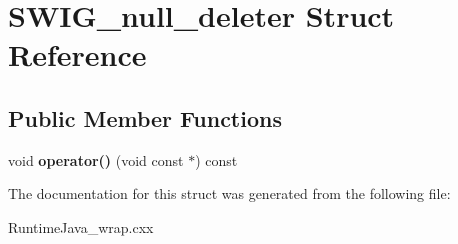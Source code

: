 \hypertarget{struct_s_w_i_g__null__deleter}{}\section{S\+W\+I\+G\+\_\+null\+\_\+deleter Struct Reference}
\label{struct_s_w_i_g__null__deleter}
\subsection*{Public Member Functions}
\begin{DoxyCompactItemize}
\item 
void {\bfseries operator()} (void const $\ast$) const \hypertarget{struct_s_w_i_g__null__deleter_aa95dacef916da5f0a455c37edaf8aefc}{}\label{struct_s_w_i_g__null__deleter_aa95dacef916da5f0a455c37edaf8aefc}

\end{DoxyCompactItemize}


The documentation for this struct was generated from the following file\+:\begin{DoxyCompactItemize}
\item 
Runtime\+Java\+\_\+wrap.\+cxx\end{DoxyCompactItemize}
